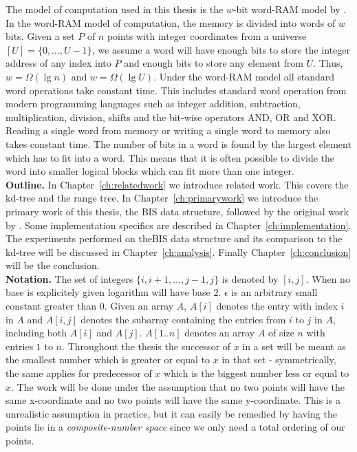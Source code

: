 The model of computation used in this thesis is the $w$-bit word-RAM model by \citet{fredman}. In the word-RAM model of computation, the memory is divided into words of $w$ bits. Given a set $P$ of $n$ points with integer coordinates from a universe $[U] = \{0, \dotsc, U-1\}$, we assume a word will have enough bits to store the integer address of any index into $P$ and enough bits to store any element from $U$. Thus, $w = \Omega(\lg n)$ and $w = \Omega(\lg U)$. Under the word-RAM model all standard word operations take constant time. This includes standard word operation from modern programming languages such as integer addition, subtraction, multiplication, division, shifts and the bit-wise operators AND, OR and XOR. Reading a single word from memory or writing a single word to memory also takes constant time. The number of bits in a word is found by the largest element which has to fit into a word. This means that it is often possible to divide the word into smaller logical blocks which can fit more than one integer. \\ 


\noindent \textbf{Outline.} In Chapter~\ref{ch:relatedwork} we introduce related work. This covers the kd-tree and the range tree. In Chapter~\ref{ch:primarywork} we introduce the primary work of this thesis, the BIS data structure, followed by the original work by \citet{chanetal}. Some implementation specifics are described in Chapter~\ref{ch:implementation}. The experiments performed on theBIS data structure and its comparison to the kd-tree will be discussed in Chapter~\ref{ch:analysis}. Finally Chapter~\ref{ch:conclusion} will be the conclusion.  \\

\noindent \textbf{Notation.} The set of integers $\{i, i+1, \dotsc, j-1, j\}$ is denoted by $[i,j]$. When no base is explicitely given logarithm will have base $2$. $\epsilon$ is an arbitrary small constant greater than $0$. Given an array $A$, $A[i]$ denotes the entry with index $i$ in $A$ and $A[i,j]$ denotes the subarray containing the entries from $i$ to $j$ in $A$, including both $A[i]$ and $A[j]$. $A[1..n]$ denotes an array $A$ of size $n$ with entries $1$ to $n$. Throughout the thesis the successor of $x$ in a set will be meant as the smallest number which is greater or equal to $x$ in that set - symmetrically, the same applies for predecessor of $x$ which is the biggest number less or equal to $x$. The work will be done under the assumption that no two points will  have the same x-coordinate and no two points will have the same y-coordinate. This is a unrealistic assumption in practice, but it can easily be remedied by having the points lie in a \emph{composite-number space} since we only need a total ordering of our points.



